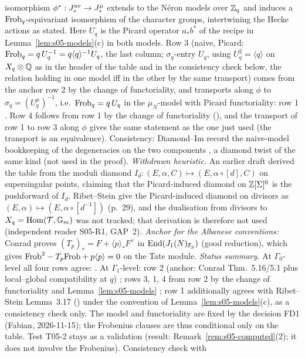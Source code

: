 \begin{remark}
isomorphism $\phi^*:J^{\rm nv}_s\to J^\mu_s$ extends to the Néron models over $\mathbb{Z}_q$ and induces a $\mathrm{Frob}_q$-equivariant isomorphism of the character
groups, intertwining the Hecke actions as stated. Here $U_q$ is the Picard operator $a_*b^*$ of the recipe in Lemma~\ref{lem:s05-models}(c) in both models. Row 3 (naive, Picard:
$\mathrm{Frob}_q=q\,U_q^{-1}=q\langle q\rangle^{-1}U_q$, the last column; $\sigma_q$-entry $U_q$, using $U_q^2=\langle q\rangle$ on $X_q\otimes\mathbb{Q}$ as in the header of the table and
in the consistency check below, the relation holding in one model iff in the other by the same transport) comes from the anchor row 2 by the change of functoriality, and
transports along $\phi$ to $\sigma_q=(U^\mu_q)^{-1}$, i.e.\ $\mathrm{Frob}_q=q\,U_q$ in the $\mu_N$-model with Picard functoriality: row 1 \stpmc. Row 4 follows from row 1 by the change of functoriality
(\stpmc), and the transport of row 1 to row 3 along $\phi$ gives the same statement as the one just used (the transport is an equivalence). Consistency: Diamond--Im record the naive-model bookkeeping of the degeneracies on the
two components , a diamond twist of the same kind (not used in the proof).
\emph{Withdrawn heuristic.} An earlier draft derived the table from the moduli diamond $I_d:(E,\alpha,C)\mapsto(E,\alpha\circ[d],C)$ on
supersingular points, claiming that the Picard-induced diamond on $\mathbb{Z}[\Sigma]^0$ is the pushforward of $I_d$. Ribet--Stein give the
Picard-induced diamond on divisors as $(E,\alpha)\mapsto(E,\alpha\circ[d^{-1}])$ (p.~29), and the dualisation from divisors to
$X_q=\operatorname{Hom}(\mathcal T,\mathbb G_m)$ was not tracked; that derivation is therefore not used (independent reader S05-R1, GAP~2).
\emph{Anchor for the Albanese conventions:} Conrad proves $(T_p)_*=F+\langle p\rangle_*F^\vee$ in $\operatorname{End}(J_1(N)_{\mathbb{F}_p})$
 (good reduction), which gives
$\mathrm{Frob}^2-T_p\mathrm{Frob}+p\langle p\rangle=0$ on the Tate module.
\emph{Status summary.} At $\Gamma_0$-level all four rows agree: \stpmc. At $\Gamma_1$-level: row 2 (anchor: Conrad Thm.~5.16/5.1 plus local--global compatibility at $q$) \stpmc; rows 3, 1, 4 from row 2 by the change of functoriality and Lemma~\ref{lem:s05-models} \stpmc; row 1 additionally agrees with Ribet--Stein Lemma~3.17 (\stcited) under the convention of Lemma~\ref{lem:s05-models}(c), as a consistency check only. The model and functoriality are fixed by the decision FD1 (Fabian, 2026-11-15); the Frobenius clauses are thus conditional only on the table. Test T05-2 stays as a validation (result: Remark~\ref{rem:s05-computed}(2); it does not involve the Frobenius). Consistency check with

\end{remark}
